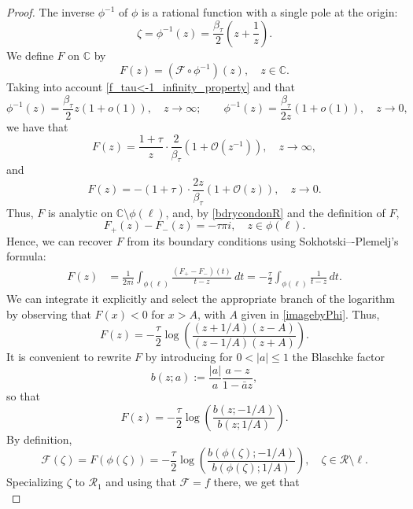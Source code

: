 \documentclass[reqno,11pt]{amsart}
\theoremstyle{plain}
\theoremstyle{definition}
\theoremstyle{remark}
\numberwithin{equation}{section}
\begin{document}
\begin{proof}
    The inverse $\phi^{-1}$ of $\phi $ is a rational function with a single pole at the origin:
    \begin{equation*}\label{varphi_inverse}
        \zeta=\phi^{-1}(z)=\frac{\beta_\tau}{2}\left(z+\frac{1}{z}\right).
    \end{equation*}
   We define $ F$ on $\mathbb{C}$ by 
    \begin{equation*}\label{F_Tilde_tau<-1}
        F(z)=\left( \mathcal F \circ \phi^{-1}\right) (z),\quad z\in\mathbb{C}.
    \end{equation*}
Taking into account \eqref{f_tau<-1_infinity_property} and that
    $$
    \phi^{-1} (z)= \frac{\beta_\tau}{2}z\left(1+o(1)\right), \quad z\to \infty; \qquad  \phi^{-1} (z)= \frac{\beta_\tau}{2z} \left(1+o(1)\right), \quad z\to 0, 
    $$
    we have that 
    \[
    F(z)
    =\frac{1+\tau}{z}\cdot\frac{2}{\beta_\tau}\left( 1+\mathcal O(z^{-1})\right), \quad z\to \infty, \]
    and
    \[
    F(z)
     = -(1+\tau)\cdot\frac{2z}{\beta_\tau}\left( 1+\mathcal O(z)\right),  \quad z \to 0.
     \]
    Thus, ${F}$ is analytic on $\mathbb{C}\setminus\phi(\ell)
    $, 
    and, by \eqref{bdrycondonR} and the definition of $F$,
    $$
    F_+(z)-F_-(z)=-\tau\pi i, \quad z\in \phi(\ell).
    $$
    Hence, we can recover $F$ from its boundary conditions using Sokhotski–-Plemelj's formula: 
\begin{equation*}\label{tau<-1_work_on_F_Tilde_Expression_1}
        \begin{split}
           F(z)&=\frac{1}{2\pi i}\int_{\phi(\ell)}\frac{\left( {F}_+- {F}_-\right)(t)}{t-z}\ dt =-\frac{\tau}{2 }\int_{\phi(\ell)}\frac{1}{t-z}\, dt. 
        \end{split}
    \end{equation*}
We can integrate it explicitly and select the appropriate branch of the logarithm by observing that $F(x)<0$ for $x>A$, with $A$ given in \eqref{imagebyPhi}. Thus,
$$
F(z)=-\frac{\tau}{2}\log\left(\frac{(z+1/A)(z-A)}{(z-1/A)(z+A)} \right).
$$
It is convenient to rewrite $F$ by introducing for $0< |a|\le 1$ the Blaschke factor
$$
b (z;a):=\frac{\left|a \right|}{a } \frac{a -z}{1-\bar{a}  z},
$$
so that
$$
F(z)=-\frac{\tau}{2}\log\left(\frac{b(z;-1/A) }{b(z;1/A)} \right).
$$
By definition,
$$
\mathcal F(\zeta)={F}(\phi(\zeta))=-\frac{\tau}{2}\log\left(\frac{b\left(\phi(\zeta);-1/A\right) }{b\left(\phi(\zeta);1/A\right)} \right),  \quad \zeta \in \mathcal R \setminus \ell. 
$$
Specializing $\zeta$ to $\mathcal R_1$ and using that $\mathcal F=f$ there, we get that
  \begin{equation}

\end{equation}
\end{proof}
\end{document}
